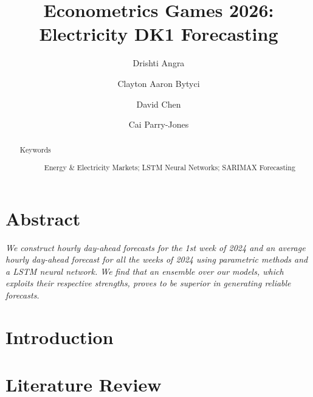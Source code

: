 \documentclass[%
 reprint,
 amsmath,amssymb,
 aps,
]{revtex4-2}
\begin{document}

\title{Econometrics Games 2026: Electricity DK1 Forecasting}%

\author{Drishti Angra}
\author{Clayton Aaron Bytyci}
\author{David Chen}
\author{Cai Parry-Jones}


\begin{abstract} 
\begin{description}
\item[Keywords]
Energy \& Electricity Markets; LSTM Neural Networks; SARIMAX Forecasting
\end{description}
\end{abstract}

\maketitle

\section*{Abstract}
\textit{%
We construct hourly day-ahead forecasts for the 1st week of 2024 and an average hourly day-ahead forecast for all the weeks of 2024 using parametric methods and a LSTM neural network. We find that an ensemble over our models, which exploits their respective strengths, proves to be superior in generating reliable forecasts.
}

\section{Introduction}\label{Intro}


\section{Literature Review}\label{Lit}
\end{document}
